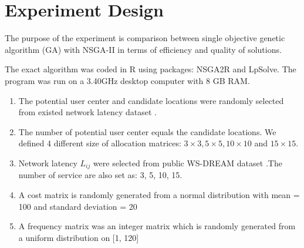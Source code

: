 \documentclass{llncs}
\begin{document}
%




\section{Experiment Design}
\label{sec:experiment}
The purpose of the experiment is comparison between single objective genetic algorithm (GA) with NSGA-II in terms of efficiency and quality of solutions. 

The exact algorithm was coded in R \cite{Morandat:2012:EDR:2367163.2367172} using packages: NSGA2R and LpSolve. The program was run on a 3.40GHz 
desktop computer with 8 GB RAM.

\begin{enumerate}
	\item The potential user center and candidate locations were randomly selected from existed network latency dataset \cite{6076756} \cite{5552800}. 
	\item The number of potential user center equals the candidate locations. We defined 4 different size of allocation matrices:
			$3 \times 3, 5 \times 5, 10 \times 10$ and $15 \times 15$.
		\item Network latency $L_{ij}$ were selected from public WS-DREAM dataset  \cite{6076756} \cite{5552800}.The number of service are also set as: 3, 5, 10, 15.
	\item A cost matrix is randomly generated from a normal distribution with mean = 100 and standard deviation = 20
	\item A frequency matrix was an integer matrix which is randomly generated from a uniform distribution on [1, 120]
\end{enumerate}
\end{document}
